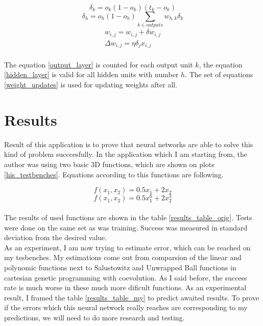 \documentclass[a4paper,oneside,onecolumn,11pt]{report}
\begin{document}
		\begin{equation}
			\label{output_layer}
			\delta_k = o_k (1 - o_k)(t_k - o_k)
		\end{equation}
		\begin{equation}
			\label{hidden_layer}
			\delta_h = o_h (1 - o_h) \displaystyle\sum_{k \in outputs} w_{h, k}\delta_k
		\end{equation}
		\begin{equation}
			\label{weight_updates}
			\begin{aligned}
			w_{i, j} = w_{i, j} + \delta w_{i, j}\\
			\Delta w_{i, j} = \eta \delta_j x_{i, j}
			\end{aligned}
		\end{equation}\\

		The equation \ref{output_layer} is counted for each output unit $k$, the equation \ref{hidden_layer}
		is valid for all hidden units with number $h$. The set of equations \ref{weight_updates} is used
		for updating weights after all.

\chapter{Results}
	Result of this application is to prove that neural networks are able to solve this kind of problem 
	succcesfully. In the application which I am starting from, the author was using two basic 3D functions, 
	which are shown on plots \ref{his_testbenches}. Equations according to this functions are
	following.

	\begin{equation}
		f(x_1, x_2) = 0.5 x_1 + 2 x_2
	\end{equation}
	\begin{equation}
		f(x_1, x_2) = 0.5 x_1^6 + 2 x_2^3
	\end{equation}\\

	The results of used functions are shown in the table \ref{results_table_orig}. Tests were done on the same
	set as was training. Success was measured in standard deviation from the desired value.\\

	As an experiment, I am now trying to estimate error, which can be reached on my tesbenches. 
	My estimations come out from comparsion of the linear and polynomic functions next to Salustowitz
	and Unwrapped Ball functions in cartesian genetic programming with coevolution. As I said before, the
	success rate is much worse in these much more dificult functions. As an experimental result, I framed
	the table \ref{results_table_my} to predict awaited results. To prove if the errors which this 
	neural network really reaches are corresponding to my predictions, we will need to do more 
	research and testing. 
\end{document}
